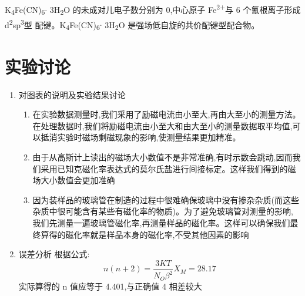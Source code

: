 \documentclass[11pt]{report}
\begin{document}
K\textsubscript{4}Fe(CN)\textsubscript{6}\(\cdot\) 3H\textsubscript{2}O 的未成对儿电子数分别为 0,中心原子 Fe\textsuperscript{2+}与 6 个氰根离子形成 d\textsuperscript{2}sp\textsuperscript{3}型
配键。K\textsubscript{4}Fe(CN)\textsubscript{6}\(\cdot\) 3H\textsubscript{2}O 是强场低自旋的共价配键型配合物。

\section{实验讨论}
\label{sec:org45a02fd}
\begin{enumerate}
\item 对图表的说明及实验结果讨论
\label{sec:org45ac449}
\begin{enumerate}
\item 在实验数据测量时,我们采用了励磁电流由小至大,再由大至小的测量方法。在处理数据时,我们将励磁电流由小至大和由大至小的测量数据取平均值,可以抵消实验时磁场剩磁现象的影响,使测量结果更加精准。
\item 由于从高斯计上读出的磁场大小数值不是非常准确,有时示数会跳动,因而我们采用已知克磁化率表达式的莫尔氏盐进行间接标定。这样我们得到的磁场大小数值会更加准确
\item 因为装样品的玻璃管在制造的过程中很难确保玻璃中没有掺杂杂质(而这些杂质中很可能含有某些有磁化率的物质)。为了避免玻璃管对测量的影响,我们先测量一遍玻璃管磁化率,再测量样品的磁化率。这样可以确保我们最终算得的磁化率就是样品本身的磁化率,不受其他因素的影响
\end{enumerate}
\item 误差分析
\label{sec:orgdd6580d}
     根据公式:
     \[
     n(n+2)=\frac{3KT}{N_{O}\beta^{2}}X_{M}=28.17
     \]
实际算得的 n 值应等于 4.401,与正确值 4 相差较大


\end{enumerate}
\end{document}
